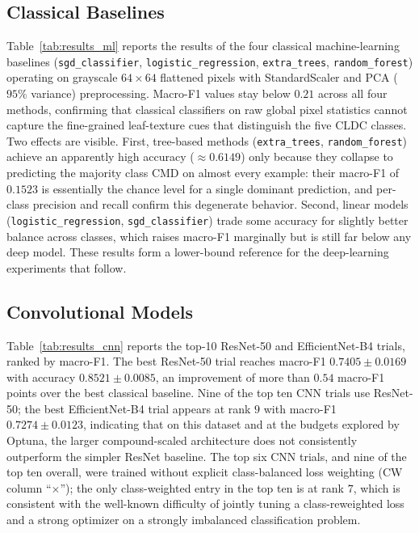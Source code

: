 \documentclass[conference]{IEEEtran}
\begin{document}
\subsection{Classical Baselines}
Table~\ref{tab:results_ml} reports the results of the four classical machine-learning baselines (\texttt{sgd\_classifier}, \texttt{logistic\_regression}, \texttt{extra\_trees}, \texttt{random\_forest}) operating on grayscale $64{\times}64$ flattened pixels with StandardScaler and PCA ($95\%$ variance) preprocessing. Macro-F1 values stay below $0.21$ across all four methods, confirming that classical classifiers on raw global pixel statistics cannot capture the fine-grained leaf-texture cues that distinguish the five CLDC classes. Two effects are visible. First, tree-based methods (\texttt{extra\_trees}, \texttt{random\_forest}) achieve an apparently high accuracy ($\approx 0.6149$) only because they collapse to predicting the majority class CMD on almost every example: their macro-F1 of $0.1523$ is essentially the chance level for a single dominant prediction, and per-class precision and recall confirm this degenerate behavior. Second, linear models (\texttt{logistic\_regression}, \texttt{sgd\_classifier}) trade some accuracy for slightly better balance across classes, which raises macro-F1 marginally but is still far below any deep model. These results form a lower-bound reference for the deep-learning experiments that follow.



\subsection{Convolutional Models}
Table~\ref{tab:results_cnn} reports the top-10 ResNet-50 and EfficientNet-B4 trials, ranked by macro-F1. The best ResNet-50 trial reaches macro-F1 $0.7405 \pm 0.0169$ with accuracy $0.8521 \pm 0.0085$, an improvement of more than $0.54$ macro-F1 points over the best classical baseline. Nine of the top ten CNN trials use ResNet-50; the best EfficientNet-B4 trial appears at rank $9$ with macro-F1 $0.7274 \pm 0.0123$, indicating that on this dataset and at the budgets explored by Optuna, the larger compound-scaled architecture does not consistently outperform the simpler ResNet baseline. The top six CNN trials, and nine of the top ten overall, were trained without explicit class-balanced loss weighting (CW column ``$\times$''); the only class-weighted entry in the top ten is at rank $7$, which is consistent with the well-known difficulty of jointly tuning a class-reweighted loss and a strong optimizer on a strongly imbalanced classification problem.
\end{document}
